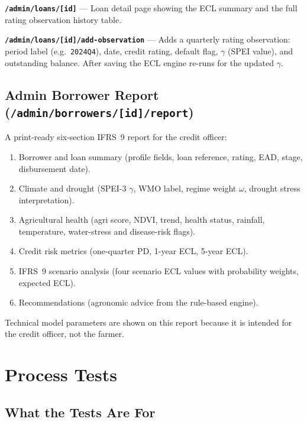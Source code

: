\documentclass[12pt,a4paper]{article}
\begin{document}
\textbf{\texttt{/admin/loans/[id]}} --- Loan detail page showing the ECL
summary and the full rating observation history table.

\textbf{\texttt{/admin/loans/[id]/add-observation}} --- Adds a quarterly
rating observation: period label (e.g.\ \texttt{2024Q4}), date, credit rating,
default flag, $\gamma$ (SPEI value), and outstanding balance.  After saving
the ECL engine re-runs for the updated $\gamma$.

\subsection{Admin Borrower Report (\texttt{/admin/borrowers/[id]/report})}

A print-ready six-section IFRS~9 report for the credit officer:

\begin{enumerate}
  \item Borrower and loan summary (profile fields, loan reference, rating,
        EAD, stage, disbursement date).
  \item Climate and drought (SPEI-3 $\gamma$, WMO label, regime weight
        $\omega$, drought stress interpretation).
  \item Agricultural health (agri score, NDVI, trend, health status, rainfall,
        temperature, water-stress and disease-risk flags).
  \item Credit risk metrics (one-quarter PD, 1-year ECL, 5-year ECL).
  \item IFRS~9 scenario analysis (four scenario ECL values with probability
        weights, expected ECL).
  \item Recommendations (agronomic advice from the rule-based engine).
\end{enumerate}

Technical model parameters are shown on this report because it is intended for
the credit officer, not the farmer.

\newpage
\section{Process Tests}

\subsection{What the Tests Are For}
\end{document}
